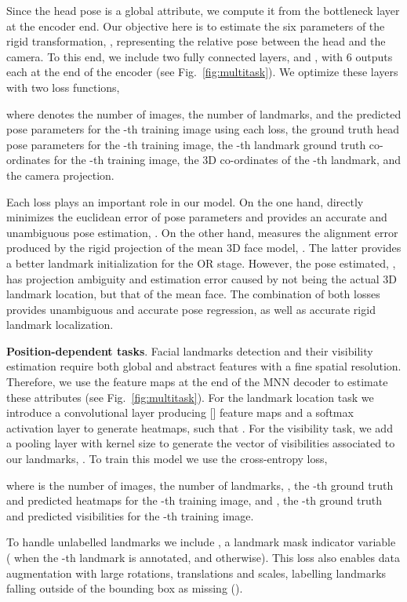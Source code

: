 \documentclass[9pt,technote,compsoc]{IEEEtran}
\begin{document}
Since the head pose is a global attribute, we compute it from the bottleneck layer at the encoder end. Our objective here is to estimate the six parameters of the rigid transformation, , representing the relative pose between the head and the camera. To this end, we include two fully connected layers,  and , with 6 outputs each at the end of the encoder (see Fig.~\ref{fig:multitask}). We optimize these layers with two loss functions,


where  denotes the number of images,  the number of landmarks,  and  the predicted pose parameters for the -th training image using each loss,  the ground truth head pose parameters for the -th training image,  the -th landmark ground truth co-ordinates for the -th training image,  the 3D co-ordinates of the -th landmark, and  the camera projection.

Each loss plays an important role in our model. On the one hand,  directly minimizes the euclidean error of pose parameters and provides an accurate and unambiguous pose estimation, . On the other hand,  measures the alignment error produced by the rigid projection of the mean 3D face model, . The latter provides a better landmark initialization for the OR stage. However, the pose estimated, , has projection ambiguity and estimation error caused by  not being the actual 3D landmark location, but that of the mean face. The combination of both losses provides unambiguous and accurate pose regression, as well as accurate rigid landmark localization. 


\textbf{Position-dependent tasks}. 
Facial landmarks detection and their visibility estimation require both global and abstract features with a fine spatial resolution. Therefore, we use the feature maps at the end of the MNN decoder to estimate these attributes (see Fig.~\ref{fig:multitask}). For the landmark location task we introduce a convolutional layer producing [] feature maps and a softmax activation layer to generate heatmaps, such that . For the visibility task, we add a pooling layer with kernel size  to generate the vector of  visibilities associated to our landmarks, . To train this model we use the cross-entropy loss,


where  is the number of images,  the number of landmarks, ,  the -th ground truth and predicted heatmaps for the -th training image, and ,  the -th ground truth and predicted visibilities for the -th training image.

To handle unlabelled landmarks we include , a landmark mask indicator variable ( when the -th landmark is annotated, and  otherwise). This loss also enables data augmentation with large rotations, translations and scales, labelling landmarks falling outside of the bounding box as missing ().
\end{document}
